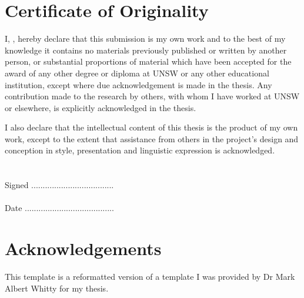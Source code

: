 


\chapter*{Certificate of Originality}
I, \authorname, hereby declare that this submission is my own work and to the best of my knowledge it contains no materials previously published or written by another person, or substantial proportions of material which have been accepted for the award of any other degree or diploma at UNSW or any other educational institution, except where due acknowledgement is made in the thesis. Any contribution made to the research by others, with whom I have worked at UNSW or elsewhere, is explicitly acknowledged in the thesis.

I also declare that the intellectual content of this thesis is the product of my own work, except to the extent that assistance from others in the project’s design and conception in style, presentation and linguistic expression is acknowledged.\\
\\
\\
Signed  ....................................\\
\\
Date    .......................................

\chapter*{Acknowledgements}
\begin{itemize*}
\item This template is a reformatted version of a template I was provided by Dr Mark Albert Whitty for my thesis.
\end{itemize*}

\tableofcontents 
\listoffigures
\clearpage

